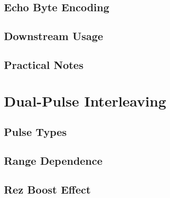 \documentclass[11pt,letterpaper]{article}
\begin{document}

\subsection{Echo Byte Encoding}
\label{subsec:doppler-echo-byte}


\subsection{Downstream Usage}
\label{subsec:doppler-downstream}


\subsection{Practical Notes}
\label{subsec:doppler-practical}



\newpage
\section{Dual-Pulse Interleaving}
\label{sec:dual-pulse}

\subsection{Pulse Types}
\label{subsec:pulse-types}


\subsection{Range Dependence}
\label{subsec:pulse-range-dependence}


\subsection{Rez Boost Effect}
\label{subsec:pulse-rez-boost}

\end{document}
